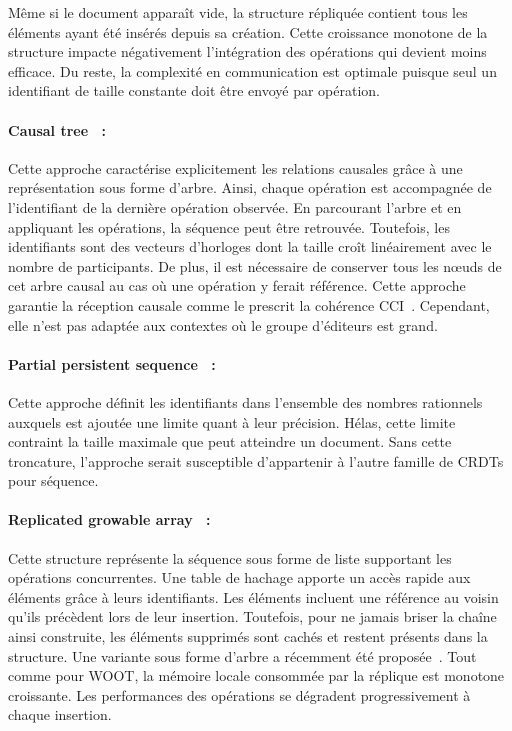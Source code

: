 \noindent Même si le document apparaît vide, la structure répliquée contient
tous les éléments ayant été insérés depuis sa création. Cette croissance
monotone de la structure impacte négativement l'intégration des opérations qui
devient moins efficace. Du reste, la complexité en communication est optimale
puisque seul un identifiant de taille constante doit être envoyé par opération.

\paragraph{Causal tree~\cite{grishchenko2010deep} :} Cette approche caractérise
explicitement les relations causales grâce à une représentation sous forme
d'arbre. Ainsi, chaque opération est accompagnée de l'identifiant de la dernière
opération observée. En parcourant l'arbre et en appliquant les opérations, la
séquence peut être retrouvée. Toutefois, les identifiants sont des vecteurs
d'horloges dont la taille croît linéairement avec le nombre de participants. De
plus, il est nécessaire de conserver tous les nœuds de cet arbre causal au cas
où une opération y ferait référence. Cette approche garantie la réception
causale comme le prescrit la cohérence CCI~\cite{sun1998achieving}. Cependant,
elle n'est pas adaptée aux contextes où le groupe d'éditeurs est grand.

\paragraph{Partial persistent sequence~\cite{wu2010partial} :} Cette approche
définit les identifiants dans l'ensemble des nombres rationnels auxquels est
ajoutée une limite quant à leur précision. Hélas, cette limite contraint la
taille maximale que peut atteindre un document. Sans cette troncature,
l'approche serait susceptible d'appartenir à l'autre famille de CRDTs pour
séquence.

\paragraph{Replicated growable array~\cite{roh2011replicated} :} Cette structure
représente la séquence sous forme de liste supportant les opérations
concurrentes. Une table de hachage apporte un accès rapide aux éléments grâce à
leurs identifiants. Les éléments incluent une référence au voisin qu'ils
précèdent lors de leur insertion. Toutefois, pour ne jamais briser la chaîne
ainsi construite, les éléments supprimés sont cachés et restent présents dans la
structure. Une variante sous forme d'arbre a récemment été
proposée~\cite{attiya2016specification}. Tout comme pour WOOT, la mémoire locale
consommée par la réplique est monotone croissante. Les performances des
opérations se dégradent progressivement à chaque insertion.

